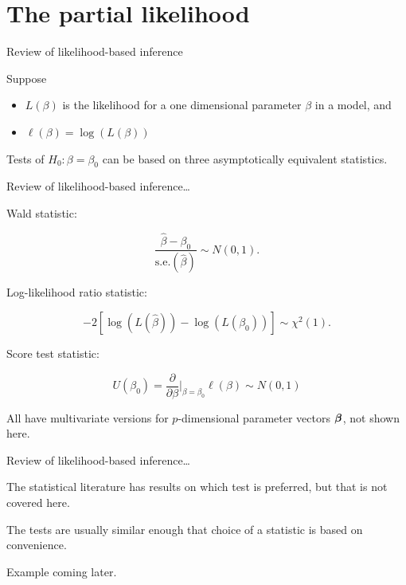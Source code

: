 \documentclass[ignorenonframetext,]{beamer}
\newcommand{\bbeta}{\mbox{\boldmath$\beta$}}
\begin{document}
\hypertarget{the-partial-likelihood-3}{%
\section{The partial likelihood}\label{the-partial-likelihood-3}}

\begin{frame}{%
\protect\hypertarget{review-of-likelihood-based-inference}{%
Review of likelihood-based inference}}

Suppose

\begin{itemize}
\item
  \(L(\beta)\) is the likelihood for a one dimensional parameter
  \(\beta\) in a model, and
\item
  \(\ell(\beta) = \log(L(\beta))\)
\end{itemize}

Tests of \(H_0:\beta = \beta_0\) can be based on three asymptotically
equivalent statistics.

\end{frame}

\begin{frame}{%
\protect\hypertarget{review-of-likelihood-based-inference-1}{%
Review of likelihood-based inference\ldots}}

Wald statistic:

\[  
  \frac{\widehat{\beta} - \beta_0}{\text{s.e.}(\widehat{\beta})} \sim N(0,1).
\]

Log-likelihood ratio statistic:

\[
-2 \left[\log(L(\widehat{\beta})) - \log(L(\beta_0))\right] \sim \chi^2 (1).
\]

Score test statistic:

\[
  U(\beta_0) =  \frac{\partial}{\partial \beta}\Bigr|_{\beta = \beta_0} \ell(\beta) \sim N(0,1)
\]

All have multivariate versions for \(p\)-dimensional parameter vectors
\(\bbeta\), not shown here.

\end{frame}

\begin{frame}{%
\protect\hypertarget{review-of-likelihood-based-inference-2}{%
Review of likelihood-based inference\ldots}}

The statistical literature has results on which test is preferred, but
that is not covered here.

The tests are usually similar enough that choice of a statistic is based
on convenience.

Example coming later.

\end{frame}
\end{document}
